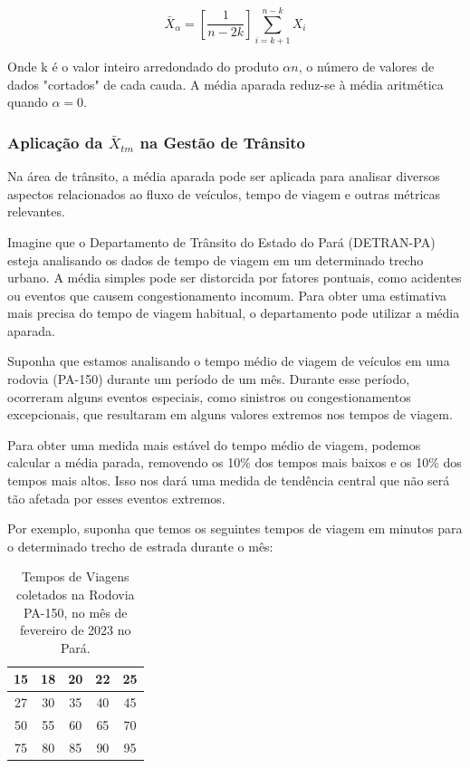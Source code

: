 \begin{equation}\label{aparada}
    \bar{X}_{\alpha} = \left[\frac{1}{n-2k} \right] \sum_{i=k+1}^{n-k}X_{i}
\end{equation}

Onde k é o valor inteiro arredondado do produto $\alpha n$, o número de valores de dados "cortados" de cada cauda. A média aparada reduz-se à média aritmética quando $\alpha = 0$.\vskip0.3cm


\subsubsection{Aplicação da $\bar{X}_{tm}$ na Gestão de Trânsito}

Na área de trânsito, a média aparada pode ser aplicada para analisar diversos aspectos relacionados ao fluxo de veículos, tempo de viagem e outras métricas relevantes. \vskip0.3cm

Imagine que o Departamento de Trânsito do Estado do Pará (DETRAN-PA) esteja analisando os dados de tempo de viagem em um determinado trecho urbano. A média simples pode ser distorcida por fatores pontuais, como acidentes ou eventos que causem congestionamento incomum. Para obter uma estimativa mais precisa do tempo de viagem habitual, o departamento pode utilizar a média aparada.\vskip0.3cm

Suponha que estamos analisando o tempo médio de viagem de veículos em uma rodovia (PA-150) durante um período de um mês. Durante esse período, ocorreram alguns eventos especiais, como sinistros ou congestionamentos excepcionais, que resultaram em alguns valores extremos nos tempos de viagem.\vskip0.3cm

Para obter uma medida mais estável do tempo médio de viagem, podemos calcular a média parada, removendo os 10\% dos tempos mais baixos e os 10\% dos tempos mais altos. Isso nos dará uma medida de tendência central que não será tão afetada por esses eventos extremos.\vskip0.3cm

Por exemplo, suponha que temos os seguintes tempos de viagem em minutos para o determinado trecho de estrada durante o mês:\vskip0.3cm


\begin{table}
    \centering
    \begin{tabular}{c|c|c|c|c}
    \hline \hline
        15 & 18 & 20 & 22 & 25 \\
        \hline
        27 & 30 & 35 & 40 & 45 \\
        \hline
        50 & 55 & 60 & 65 & 70 \\
        \hline
        75 & 80 & 85 & 90 & 95 \\
    \hline \hline
    \end{tabular}
    \caption{Tempos de Viagens coletados na Rodovia PA-150, no mês de fevereiro de 2023 no Pará.}
    \label{tab:my_label}
\end{table}

